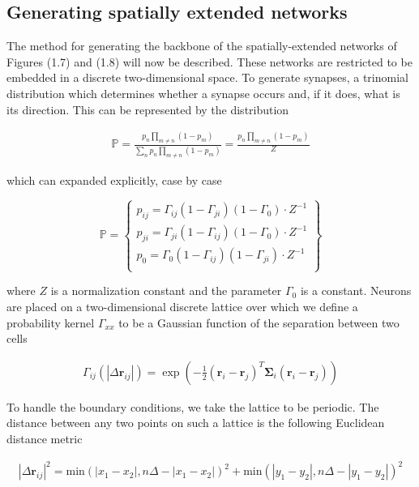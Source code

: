 \documentclass{ucetd}
\begin{document}
\subsection{Generating spatially extended networks}

The method for generating the backbone of the spatially-extended networks of Figures (1.7) and (1.8) will now be described. These networks are restricted to be embedded in a discrete two-dimensional space. To generate synapses, a trinomial distribution which determines whether a synapse occurs and, if it does, what is its direction. This can be represented by the distribution

\begin{align}
\mathbb{P} = \frac{p_{n}\prod_{m\neq n}(1-p_{m})}{\sum_{n}p_{n}\prod_{m\neq n}(1-p_{m})} = \frac{p_{n}\prod_{m\neq n}(1-p_{m})}{Z}
\end{align}

which can expanded explicitly, case by case

\begin{equation}
    \mathbb{P} = \left\{\begin{array}{lr}
        p_{ij} = \Gamma_{ij}(1-\Gamma_{ji})(1-\Gamma_{0})\cdot Z^{-1}\\
        p_{ji} = \Gamma_{ji}(1-\Gamma_{ij})(1-\Gamma_{0})\cdot Z^{-1}\\
        p_{0} = \Gamma_{0}(1-\Gamma_{ij})(1-\Gamma_{ji})\cdot Z^{-1}\\
        \end{array}\right\}
\end{equation}

where $Z$ is a normalization constant and the parameter $\Gamma_{0}$ is a constant. Neurons are placed on a two-dimensional discrete lattice over which we define a probability kernel $\Gamma_{xx}$ to be a Gaussian function of the separation between two cells

\begin{align}
\Gamma_{ij}(|\Delta\mathbf{r}_{ij}|) = \exp\left(-\frac{1}{2}(\mathbf{r}_{i}-\mathbf{r}_{j})^{T}\mathbf{\Sigma}_{i}(\mathbf{r}_{i}-\mathbf{r}_{j})\right)
\end{align}

To handle the boundary conditions, we take the lattice to be periodic. The distance between any two points on such a lattice is the following Euclidean distance metric

\begin{align*}
|\Delta\mathbf{r}_{ij}|^{2} = \mathrm{min}(|x_1 - x_2|, n\Delta - |x_1 - x_2|)^2 + \mathrm{min}(|y_1 - y_2|, n\Delta - |y_1 - y_2|)^2
\end{align*}
\end{document}
